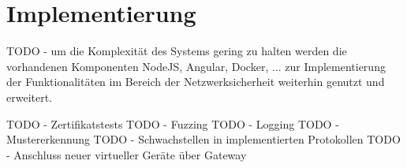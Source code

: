 \chapter{Implementierung}
TODO - um die Komplexität des Systems gering zu halten werden die vorhandenen Komponenten NodeJS, Angular, Docker, ... zur Implementierung der Funktionalitäten im Bereich der Netzwerksicherheit weiterhin genutzt und erweitert.

TODO - Zertifikatstests
TODO - Fuzzing
TODO - Logging
TODO - Mustererkennung
TODO - Schwachstellen in implementierten Protokollen
TODO - Anschluss neuer virtueller Geräte über Gateway